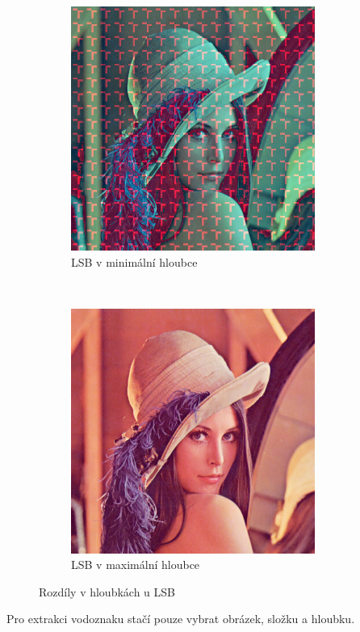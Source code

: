 \begin{figure}[h!]
    \begin{center}
        \begin{subfigure}[t]{0.5\textwidth}
            \centering
            \includegraphics[height=8cm]{images/lsb_0.jpg}
            \caption{LSB v minimální hloubce}
        \end{subfigure}%
        ~
        \begin{subfigure}[t]{0.5\textwidth}
            \centering
            \includegraphics[height=8cm]{images/lsb_7.jpg}
            \caption{LSB v maximální hloubce}
        \end{subfigure}
        \caption{Rozdíly v hloubkách u LSB}
    \end{center}
\end{figure}


\clearpage


Pro extrakci vodoznaku stačí pouze vybrat obrázek, složku a hloubku.

